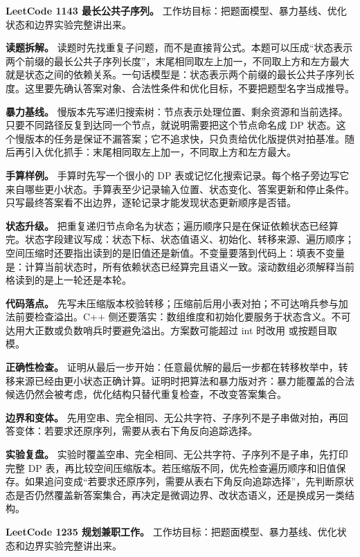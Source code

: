 \noindent\textbf{LeetCode 1143 最长公共子序列。} 工作坊目标：把题面模型、暴力基线、优化状态和边界实验完整讲出来。

\textbf{读题拆解。} 读题时先找重复子问题，而不是直接背公式。本题可以压成“状态表示两个前缀的最长公共子序列长度”，末尾相同取左上加一，不同取上方和左方最大就是状态之间的依赖关系。一句话模型是：状态表示两个前缀的最长公共子序列长度。这里要先确认答案对象、合法性条件和优化目标，不要把题型名字当成推导。

\textbf{暴力基线。} 慢版本先写递归搜索树：节点表示处理位置、剩余资源和当前选择。只要不同路径反复到达同一个节点，就说明需要把这个节点命名成 DP 状态。这个慢版本的任务是保证不漏答案；它不追求快，只负责给优化版提供对拍基准。随后再引入优化抓手：末尾相同取左上加一，不同取上方和左方最大。

\textbf{手算样例。} 手算时先写一个很小的 DP 表或记忆化搜索记录。每个格子旁边写它来自哪些更小状态。手算表至少记录输入位置、状态变化、答案更新和停止条件。只写最终答案看不出边界，逐轮记录才能发现状态更新顺序是否错。

\textbf{状态升级。} 把重复递归节点命名为状态；遍历顺序只是在保证依赖状态已经算完。状态字段建议写成：状态下标、状态值语义、初始化、转移来源、遍历顺序；空间压缩时还要指出读到的是旧值还是新值。不变量要落到代码上：填表不变量是：计算当前状态时，所有依赖状态已经算完且语义一致。滚动数组必须解释当前格读到的是上一轮还是本轮。

\textbf{代码落点。} 先写未压缩版本校验转移；压缩前后用小表对拍；不可达哨兵参与加法前要检查溢出。C++ 侧还要落实：数组维度和初始化要服务于状态含义。不可达用大正数或负数哨兵时要避免溢出。方案数可能超过 int 时改用  或按题目取模。

\textbf{正确性检查。} 证明从最后一步开始：任意最优解的最后一步都在转移枚举中，转移来源已经由更小状态正确计算。证明时把算法和暴力版对齐：暴力能覆盖的合法候选仍然会被考虑，优化结构只替代重复检查，不改变答案集合。

\textbf{边界和变体。} 先用空串、完全相同、无公共字符、子序列不是子串做对拍，再回答变体：若要求还原序列，需要从表右下角反向追踪选择。

\textbf{实验复盘。} 实验时覆盖空串、完全相同、无公共字符、子序列不是子串，先打印完整 DP 表，再比较空间压缩版本。若压缩版不同，优先检查遍历顺序和旧值保存。如果追问变成“若要求还原序列，需要从表右下角反向追踪选择”，先判断原状态是否仍然覆盖新答案集合，再决定是微调边界、改状态语义，还是换成另一类结构。

\noindent\textbf{LeetCode 1235 规划兼职工作。} 工作坊目标：把题面模型、暴力基线、优化状态和边界实验完整讲出来。

